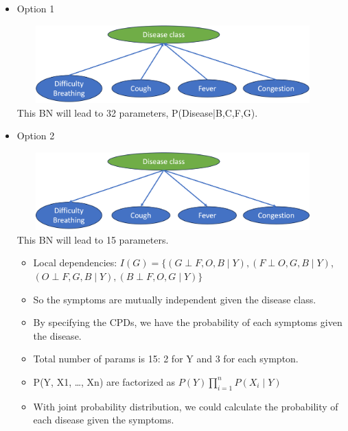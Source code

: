 \documentclass[11pt,a4paper]{report}
\begin{document}
\begin{itemize}
    \item Option 1
    
    \includegraphics[width = 12cm, height = 3cm]{bay2.png}\\
    This BN will lead to 32 parameters, P(Disease|B,C,F,G).

    \item Option 2
    
    \includegraphics[width = 12cm, height = 3cm]{bay1.png}\\
    This BN will lead to 15 parameters.

    \begin{itemize}
        \item Local dependencies: $I(G) = \{(G \perp F,O,B \mid Y), (F \perp O,G,B \mid Y)$, \\
        $(O \perp F,G,B \mid Y), (B \perp F,O,G \mid Y)\}$
        \item So the symptoms are mutually independent given the disease class.
        \item By specifying the CPDs, we have the probability of each symptoms given the disease.
        \item Total number of params is 15: 2 for Y and 3 for each sympton.
        \item P(Y, X1, \ldots, Xn) are factorized as $P(Y)\prod_{i=1}^{n}P(X_{i} \mid Y)$
        \item With joint probability distribution, we could calculate the probability of each disease given the symptoms.
    \end{itemize}



\end{itemize}
\end{document}
